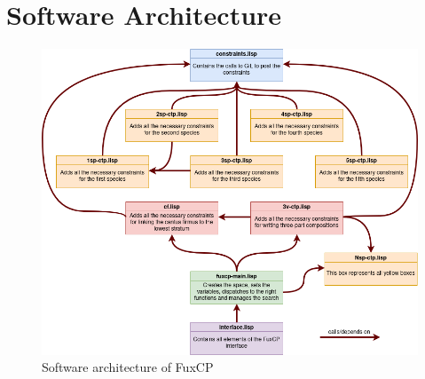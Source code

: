 \chapter{Software Architecture}\label{chapter:architecture}
\begin{figure}[h]
    \centering
    \includegraphics[width=1\textwidth]{Images/structure_memoire.png}
    \caption{Software architecture of FuxCP}
    \label{fig:softwarearchitecure}
\end{figure}